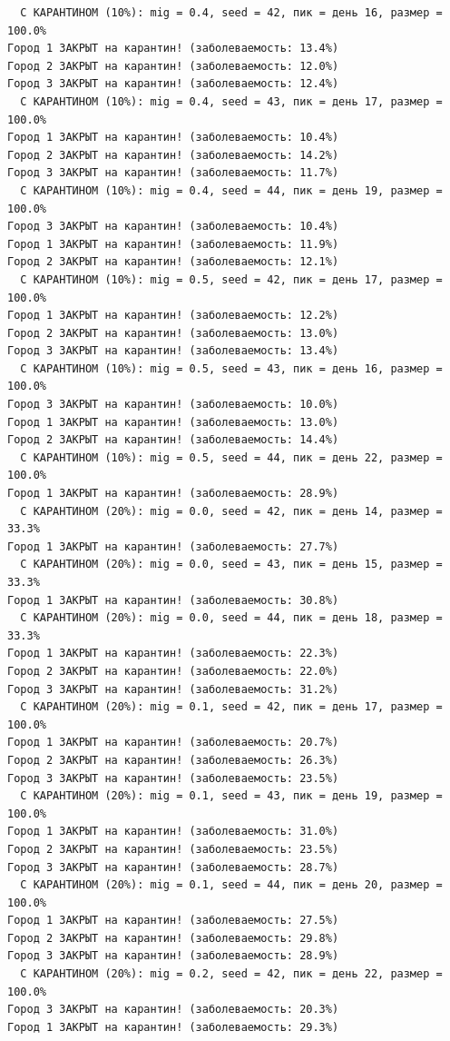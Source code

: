 \documentclass[
  12pt,
  a4paper,
  DIV=11,
  numbers=noendperiod]{scrreprt}
\begin{document}
\begin{verbatim}
  С КАРАНТИНОМ (10%): mig = 0.4, seed = 42, пик = день 16, размер = 100.0%
Город 1 ЗАКРЫТ на карантин! (заболеваемость: 13.4%)
Город 2 ЗАКРЫТ на карантин! (заболеваемость: 12.0%)
Город 3 ЗАКРЫТ на карантин! (заболеваемость: 12.4%)
  С КАРАНТИНОМ (10%): mig = 0.4, seed = 43, пик = день 17, размер = 100.0%
Город 1 ЗАКРЫТ на карантин! (заболеваемость: 10.4%)
Город 2 ЗАКРЫТ на карантин! (заболеваемость: 14.2%)
Город 3 ЗАКРЫТ на карантин! (заболеваемость: 11.7%)
  С КАРАНТИНОМ (10%): mig = 0.4, seed = 44, пик = день 19, размер = 100.0%
Город 3 ЗАКРЫТ на карантин! (заболеваемость: 10.4%)
Город 1 ЗАКРЫТ на карантин! (заболеваемость: 11.9%)
Город 2 ЗАКРЫТ на карантин! (заболеваемость: 12.1%)
  С КАРАНТИНОМ (10%): mig = 0.5, seed = 42, пик = день 17, размер = 100.0%
Город 1 ЗАКРЫТ на карантин! (заболеваемость: 12.2%)
Город 2 ЗАКРЫТ на карантин! (заболеваемость: 13.0%)
Город 3 ЗАКРЫТ на карантин! (заболеваемость: 13.4%)
  С КАРАНТИНОМ (10%): mig = 0.5, seed = 43, пик = день 16, размер = 100.0%
Город 3 ЗАКРЫТ на карантин! (заболеваемость: 10.0%)
Город 1 ЗАКРЫТ на карантин! (заболеваемость: 13.0%)
Город 2 ЗАКРЫТ на карантин! (заболеваемость: 14.4%)
  С КАРАНТИНОМ (10%): mig = 0.5, seed = 44, пик = день 22, размер = 100.0%
Город 1 ЗАКРЫТ на карантин! (заболеваемость: 28.9%)
  С КАРАНТИНОМ (20%): mig = 0.0, seed = 42, пик = день 14, размер = 33.3%
Город 1 ЗАКРЫТ на карантин! (заболеваемость: 27.7%)
  С КАРАНТИНОМ (20%): mig = 0.0, seed = 43, пик = день 15, размер = 33.3%
Город 1 ЗАКРЫТ на карантин! (заболеваемость: 30.8%)
  С КАРАНТИНОМ (20%): mig = 0.0, seed = 44, пик = день 18, размер = 33.3%
Город 1 ЗАКРЫТ на карантин! (заболеваемость: 22.3%)
Город 2 ЗАКРЫТ на карантин! (заболеваемость: 22.0%)
Город 3 ЗАКРЫТ на карантин! (заболеваемость: 31.2%)
  С КАРАНТИНОМ (20%): mig = 0.1, seed = 42, пик = день 17, размер = 100.0%
Город 1 ЗАКРЫТ на карантин! (заболеваемость: 20.7%)
Город 2 ЗАКРЫТ на карантин! (заболеваемость: 26.3%)
Город 3 ЗАКРЫТ на карантин! (заболеваемость: 23.5%)
  С КАРАНТИНОМ (20%): mig = 0.1, seed = 43, пик = день 19, размер = 100.0%
Город 1 ЗАКРЫТ на карантин! (заболеваемость: 31.0%)
Город 2 ЗАКРЫТ на карантин! (заболеваемость: 23.5%)
Город 3 ЗАКРЫТ на карантин! (заболеваемость: 28.7%)
  С КАРАНТИНОМ (20%): mig = 0.1, seed = 44, пик = день 20, размер = 100.0%
Город 1 ЗАКРЫТ на карантин! (заболеваемость: 27.5%)
Город 2 ЗАКРЫТ на карантин! (заболеваемость: 29.8%)
Город 3 ЗАКРЫТ на карантин! (заболеваемость: 28.9%)
  С КАРАНТИНОМ (20%): mig = 0.2, seed = 42, пик = день 22, размер = 100.0%
Город 3 ЗАКРЫТ на карантин! (заболеваемость: 20.3%)
Город 1 ЗАКРЫТ на карантин! (заболеваемость: 29.3%)

\end{verbatim}
\end{document}

